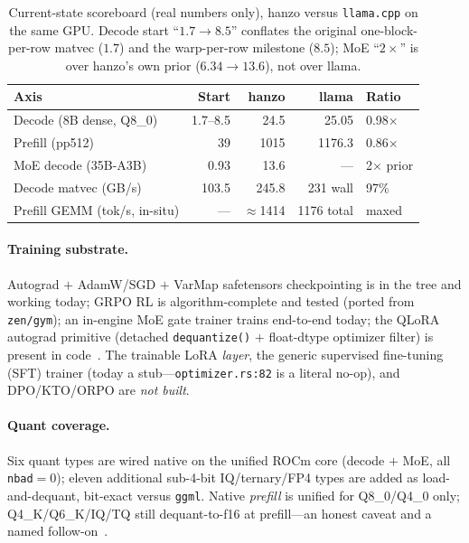 \documentclass[11pt]{article}
\begin{document}
\begin{table}[h]
\centering
\caption{Current-state scoreboard (real numbers only), hanzo versus \texttt{llama.cpp} on the same GPU. Decode start ``$1.7\to 8.5$'' conflates the original one-block-per-row matvec ($1.7$) and the warp-per-row milestone ($8.5$); MoE ``$2\times$'' is over hanzo's own prior ($6.34\to 13.6$), not over llama.}
\label{tab:scoreboard}
\begin{tabular}{lrrrl}
\toprule
\textbf{Axis} & \textbf{Start} & \textbf{hanzo} & \textbf{llama} & \textbf{Ratio} \\
\midrule
Decode (8B dense, Q8\_0)   & 1.7--8.5 & 24.5  & 25.05 & 0.98$\times$ \\
Prefill (pp512)           & 39   & 1015  & 1176.3 & 0.86$\times$ \\
MoE decode (35B-A3B)      & 0.93 & 13.6  & ---    & 2$\times$ prior \\
Decode matvec (GB/s)      & 103.5 & 245.8 & 231 wall & 97\% \\
Prefill GEMM (tok/s, in-situ) & --- & $\approx$1414 & 1176 total & maxed \\
\bottomrule
\end{tabular}
\end{table}

\paragraph{Training substrate.} Autograd $+$ AdamW/SGD $+$ VarMap safetensors checkpointing is in the tree and working today; GRPO RL is algorithm-complete and tested (ported from \texttt{zen/gym}); an in-engine MoE gate trainer trains end-to-end today; the QLoRA autograd primitive (detached \texttt{dequantize()} $+$ float-dtype optimizer filter) is present in code~\cite{hanzo-train}. The trainable LoRA \emph{layer}, the generic supervised fine-tuning (SFT) trainer (today a stub---\texttt{optimizer.rs:82} is a literal no-op), and DPO/KTO/ORPO are \emph{not built}.

\paragraph{Quant coverage.} Six quant types are wired native on the unified ROCm core (decode $+$ MoE, all \texttt{nbad}$=0$); eleven additional sub-4-bit IQ/ternary/FP4 types are added as load-and-dequant, bit-exact versus \texttt{ggml}. Native \emph{prefill} is unified for Q8\_0/Q4\_0 only; Q4\_K/Q6\_K/IQ/TQ still dequant-to-f16 at prefill---an honest caveat and a named follow-on~\cite{hanzo-rocm}.
\end{document}
